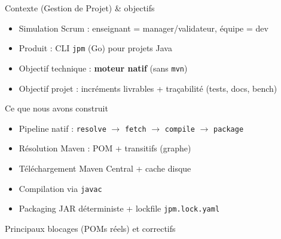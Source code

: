 \documentclass[aspectratio=169]{beamer}
\subtitle{Simulation Scrum (Gestion de Projet) : blocages, correctifs, performances vs Maven}
\author{Équipe projet (go-jpm)}
\date{26 décembre 2025}
\begin{document}
\begin{frame}
  \titlepage
\end{frame}

\begin{frame}{Contexte (Gestion de Projet) \& objectifs}
\begin{itemize}
  \item Simulation Scrum : enseignant = manager/validateur, équipe = dev
  \item Produit : CLI \texttt{jpm} (Go) pour projets Java
  \item Objectif technique : \textbf{moteur natif} (sans \texttt{mvn})
  \item Objectif projet : incréments livrables + traçabilité (tests, docs, bench)
\end{itemize}
\end{frame}

\begin{frame}{Ce que nous avons construit}
\begin{itemize}
  \item Pipeline natif : \texttt{resolve} $\rightarrow$ \texttt{fetch} $\rightarrow$ \texttt{compile} $\rightarrow$ \texttt{package}
  \item Résolution Maven : POM + transitifs (graphe)
  \item Téléchargement Maven Central + cache disque
  \item Compilation via \texttt{javac}
  \item Packaging JAR déterministe + lockfile \texttt{jpm.lock.yaml}
\end{itemize}
\end{frame}

\begin{frame}{Principaux blocages (POMs réels) et correctifs}
\end{frame}
\end{document}
